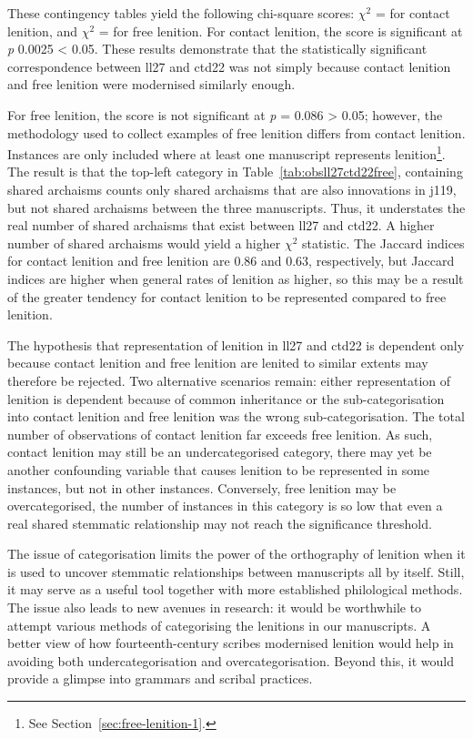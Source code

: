 These contingency tables yield the following chi-square scores: \(\chi^2\) =  for contact lenition, and \(\chi^2\) =  for free lenition. For contact lenition, the score is significant at \emph{p} 0.0025 < 0.05. These results  demonstrate that the statistically significant correspondence between \gls{ll27} and \gls{ctd22} was not simply because contact lenition and free lenition were modernised similarly enough. 

For free lenition, the score is not significant at \emph{p} = 0.086 > 0.05; however, the methodology used to collect examples of free lenition differs from contact lenition. Instances are only included where at least one manuscript represents lenition\footnote{See Section~\ref{sec:free-lenition-1}.}. The result is that the top-left category in Table~\ref{tab:obsll27ctd22free}, containing shared archaisms counts only shared archaisms that are also innovations in \gls{j119}, but not shared archaisms between the three manuscripts. Thus, it understates the real number of shared archaisms that exist between \gls{ll27} and \gls{ctd22}. A higher number of shared archaisms would yield a higher \(\chi^2\) statistic. The Jaccard indices for contact lenition and free lenition are 0.86 and 0.63, respectively, but Jaccard indices are higher when general rates of lenition as higher, so this may be a result of the greater tendency for contact lenition to be represented compared to free lenition.

The hypothesis that representation of lenition in \gls{ll27} and \gls{ctd22} is dependent only because contact lenition and free lenition are lenited to similar extents may therefore be rejected. Two alternative scenarios remain: either representation of lenition is dependent because of common inheritance or the sub-categorisation into contact lenition and free lenition was the wrong sub-categorisation. 
The total number of observations of contact lenition far exceeds free lenition. As such, contact lenition may still be an undercategorised category, \ie there may yet be another confounding variable that causes lenition to be represented in some instances, but not in other instances. Conversely, free lenition may be overcategorised, \ie the number of instances in this category is so low that even a real shared stemmatic relationship may not reach the significance threshold. 

The issue of categorisation  limits the power of the orthography of lenition when it is used to uncover stemmatic relationships between manuscripts all by itself. Still, it may serve as a useful tool together with more established philological methods. The issue also leads to new avenues in research: it would be worthwhile to attempt various methods of categorising the lenitions in our manuscripts. A better view of how fourteenth-century scribes modernised lenition would help in avoiding both undercategorisation and overcategorisation. Beyond this, it would provide a glimpse into  grammars and scribal practices.

